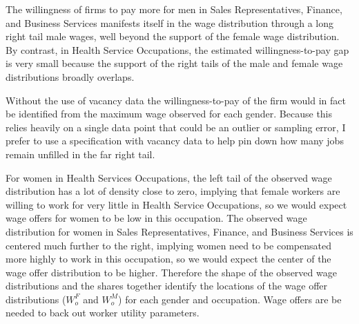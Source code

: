 \documentclass[12pt]{article}
\begin{document}
The willingness of firms to pay more for men in Sales Representatives, Finance, and Business Services manifests itself in the wage distribution through a long right tail male wages, well beyond the support of the female wage distribution. By contrast, in Health Service Occupations, the estimated willingness-to-pay gap is very small because the support of the right tails of the male and female wage distributions broadly overlaps.

Without the use of vacancy data the willingness-to-pay of the firm would in fact be identified from the maximum wage observed for each gender. Because this relies heavily on a single data point that could be an outlier or sampling error, I prefer to use a specification with vacancy data to help pin down how many jobs remain unfilled in the far right tail.

For women in Health Services Occupations, the left tail of the observed wage distribution has a lot of density close to zero, implying that female workers are willing to work for very little in Health Service Occupations, so we would expect wage offers for women to be low in this occupation. The observed wage distribution for women in Sales Representatives, Finance, and Business Services is centered much further to the right, implying women need to be compensated more highly to work in this occupation, so we would expect the center of the wage offer distribution to be higher. Therefore the shape of the observed wage distributions and the shares together identify the locations of the wage offer distributions ($W^F_{o}$ and $W^M_{o}$) for each gender and occupation. Wage offers are be needed to back out worker utility parameters.


\end{document}
